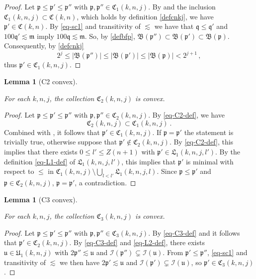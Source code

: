\documentclass[10pt,a4paper]{article}
\theoremstyle{plain}
\newtheorem{lemma}[theorem]{Lemma}
\theoremstyle{definition}
\numberwithin{equation}{subsection}
\newcommand{\fp}{{\mathfrak p}}
\newcommand{\fu}{{\mathfrak u}}
\newcommand{\fU}{{\mathfrak U}}
\newcommand{\fq}{{\mathfrak q}}
\newcommand{\fL}{{\mathfrak L}}
\newcommand{\fC}{{\mathfrak C}}
\newcommand{\scI}{{\mathcal{I}}} %
\newcommand{\lean}[1]{}
\newcommand{\uses}[1]{}
\newcommand{\leanok}{}
\begin{document}
\begin{proof}
    \leanok
    Let $\fp\le\fp'\le\fp''$ with $\fp, \fp'' \in \fC_1(k,n,j)$. By  and the inclusion $\fC_1(k,n,j) \subset \fC(k,n)$, which holds by definition \eqref{defcnkj}, we have $\fp' \in \fC(k,n)$. By \eqref{eq-sc1} and transitivity of $\lesssim$ we have that $\fq \le \fq'$ and $100 \fq' \lesssim \mathfrak{m}$ imply $100 \fq \lesssim \mathfrak{m}$. So, by \eqref{defbfp}, $\mathfrak{B}(\fp'') \subset \mathfrak{B}(\fp') \subset \mathfrak{B}(\fp)$. Consequently, by \eqref{defcnkj}
    $$
        2^j \le |\mathfrak{B}(\fp'')|\le |\mathfrak{B}(\fp')| \le |\mathfrak{B}(\fp)| < 2^{j+1}\,,
    $$
    thus $\fp' \in \fC_1(k,n,j)$.
\end{proof}

\begin{lemma}[C2 convex]
    \label{C2-convex}
    \leanok
    \lean{ordConnected_C2}
    \uses{C1-convex}
    For each $k,n,j$, the collection $\fC_2(k,n,j)$ is convex.
\end{lemma}

\begin{proof}
    \leanok
     Let $\fp \le \fp' \le \fp''$ with $\fp, \fp'' \in \fC_2(k,n,j)$. By \eqref{eq-C2-def}, we have
     \begin{equation*}
         \fC_2(k,n,j) \subset \fC_1(k,n,j)\ .
     \end{equation*} Combined with , it follows that $\fp' \in \fC_1(k,n,j)$.
     If $\fp=\fp'$ the statement is trivially true, otherwise suppose that $\fp' \notin \fC_2(k,n,j)$.
     By \eqref{eq-C2-def}, this implies that there exists $0 \le l' \le Z(n+1)$ with $\fp' \in \fL_1(k,n,j,l')$.
     By the definition \eqref{eq-L1-def} of $\fL_1(k,n,j,l')$, this implies that $\fp'$ is minimal
     with respect to $\le$ in $\fC_1(k,n,j) \setminus \bigcup_{l < l'} \fL_1(k,n,j,l)$.
     Since $\fp\le\fp'$ and $\fp\in\fC_2(k,n,j)$, $\fp=\fp'$, a contradiction.
\end{proof}

\begin{lemma}[C3 convex]
    \label{C3-convex}
    \leanok
    \lean{ordConnected_C3}
    \uses{C2-convex}
    For each $k,n,j$, the collection $\fC_3(k,n,j)$ is convex.
\end{lemma}

\begin{proof}
    \leanok
    Let $\fp \le \fp' \le \fp''$ with $\fp, \fp'' \in \fC_3(k,n,j)$.
    By \eqref{eq-C3-def} and  it follows that $\fp' \in \fC_2(k,n,j)$.
    By \eqref{eq-C3-def} and \eqref{eq-L2-def}, there exists $\fu \in \fU_1(k,n,j)$ with
    $2\fp'' \lesssim \fu$ and $\scI(\fp'') \subsetneq \scI(\fu)$. From $\fp' \le \fp''$,
    \eqref{eq-sc1} and transitivity of $\lesssim$ we then have
    $2\fp' \lesssim \fu$ and $\scI(\fp') \subsetneq \scI(\fu)$, so $\fp' \in \fC_3(k,n,j)$.
\end{proof}
\end{document}
